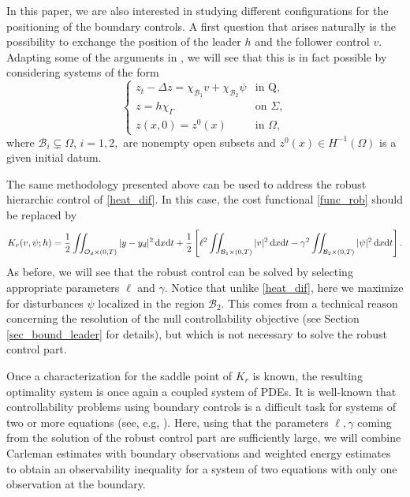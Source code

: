 \documentclass{aims}
\theoremstyle{definition}
\newcommand\csin[1]{\chi_{#1}}
\def\dx{\,\textnormal{d}x}
\def\dt{\textnormal{d}t}
\begin{document}
In this paper, we are also interested in studying different configurations for the positioning of the boundary controls. A first question that arises naturally is the possibility to exchange the position of the leader $h$ and the follower control $v$. Adapting some of the arguments in \cite{da_silva}, we will see that this is in fact possible by considering systems of the form 
%
\begin{equation}\label{heat_dif}
\begin{cases}
z_t-\Delta z=\csin{\mathcal B_1}v+\csin{\mathcal B_2}\psi & \text{in Q}, \\
z=h\csin{\Gamma} &\text{on } \Sigma, \\
z(x,0)=z^0(x) & \text{in } \Omega,
\end{cases}
\end{equation}
%
where {$\mathcal B_i \subsetneq \Omega$}, $i=1,2,$ are nonempty open subsets and ${z^0(x)\in H^{-1}(\Omega)}$ is a given initial datum. 

The same methodology presented above can be used to address the robust hierarchic control of \eqref{heat_dif}. In this case, the cost functional \eqref{func_rob} should be replaced by 
%
\begin{equation}\label{func_rob_dif}
K_r(v,\psi;h)=\frac{1}{2}\iint_{\mathcal O_d\times(0,T)}|y-y_d|^2\dx\dt+\frac{1}{2}\left[\ell^2\iint_{\mathcal B_1\times(0,T)}|v|^2\dx\dt-\gamma^2\iint_{\mathcal B_2\times(0,T)}|\psi|^2\dx\dt\right].
\end{equation}
%
As before, we will see that the robust control can be solved by selecting appropriate parameters $\ell$ and $\gamma$. Notice that unlike \eqref{heat_dif}, here we maximize for disturbances $\psi$ localized in the region $\mathcal B_2$. This comes from a technical reason concerning the resolution of the null controllability objective (see Section {\ref{sec_bound_leader}} for details), but which is not necessary to solve the robust control part. 

Once a characterization for the saddle point of $K_r$ is known, the resulting optimality system is once again a coupled system of PDEs. It is well-known that controllability problems using boundary controls is a difficult task for systems of two or more equations (see, e.g, \cite{assia_survey,assia_luz_new}). Here,  using that the parameters $\ell,\gamma$ coming from the solution of the robust control part are sufficiently large, we will combine Carleman estimates with boundary observations and weighted energy estimates to obtain an observability inequality for a system of two equations with only one observation at the boundary.
\end{document}
